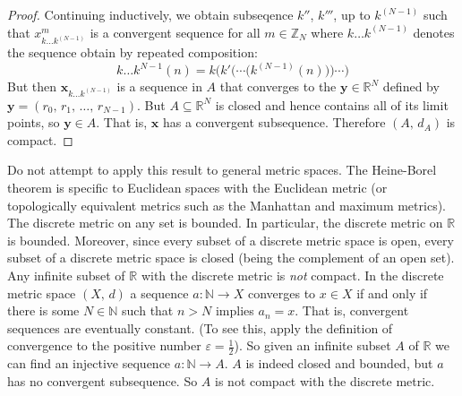 \documentclass{article}
\theoremstyle{plain}
\theoremstyle{normal}
\begin{document}
\begin{proof}
            Continuing inductively, we obtain subseqence
            $k''$, $k'''$, up to $k^{(N-1)}$ such that
            $x_{k\dots{k}^{(N-1)}}^{m}$ is a convergent sequence for all
            $m\in\mathbb{Z}_{N}$ where $k\dots{k}^{(N-1)}$ denotes the sequence
            obtain by repeated composition:
            \begin{equation}
                k\dots{k}^{N-1}(n)=k\bigg(k'\Big(\cdots\big(k^{(N-1)}(n)\big)\Big)\cdots\bigg)
            \end{equation}
            But then
            $\mathbf{x}_{k\dots{k}^{(N-1)}}$ is a sequence in $A$ that converges
            to the $\mathbf{y}\in\mathbb{R}^{N}$ defined by
            $\mathbf{y}=(r_{0},\,r_{1},\,\dots,\,r_{N-1})$. But
            $A\subseteq\mathbb{R}^{N}$ is closed and hence contains all of its
            limit points, so $\mathbf{y}\in{A}$. That is, $\mathbf{x}$ has a
            convergent subsequence. Therefore $(A,\,d_{A})$ is compact.
        \end{proof}
        Do not attempt to apply this result to general metric spaces. The
        Heine-Borel theorem is specific to Euclidean spaces with the Euclidean
        metric (or topologically equivalent metrics such as the Manhattan and
        maximum metrics). The discrete metric on any set is bounded. In
        particular, the discrete metric on $\mathbb{R}$ is bounded. Moreover,
        since every subset of a discrete metric space is open, every subset of
        a discrete metric space is closed (being the complement of an open set).
        Any infinite subset of $\mathbb{R}$ with the discrete metric is
        \textit{not} compact. In the discrete metric space $(X,\,d)$ a sequence
        $a:\mathbb{N}\rightarrow{X}$ converges to $x\in{X}$ if and only if
        there is some $N\in\mathbb{N}$ such that $n>N$ implies
        $a_{n}=x$. That is, convergent sequences are eventually constant.
        (To see this, apply the definition of convergence to the positive
        number $\varepsilon=\frac{1}{2}$). So given an infinite subset $A$ of
        $\mathbb{R}$ we can find an injective sequence
        $a:\mathbb{N}\rightarrow{A}$. $A$ is indeed closed and bounded, but
        $a$ has no convergent subsequence. So $A$ is not compact with the
        discrete metric.
\end{document}
